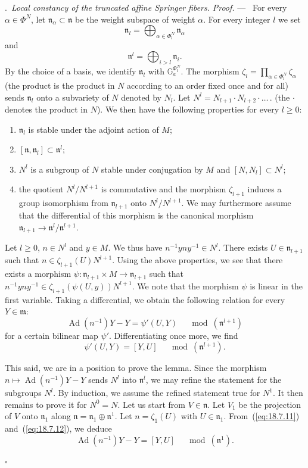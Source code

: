 \documentclass[12pt,a4paper,oneside,english,leqno]{smfart}
\makeatletter
\numberwithin{equation}{subsection}
\numberwithin{theo}{subsection}
\newenvironment{paragr}[1][]{\medskip\refstepcounter{subsection}%
  \par\noindent\hspace*{\parindent}\thesubsection.\ \emph{#1}%
  \@ifundefined{@empty}{}{}\ignorespaces}{\medskip}
\theoremstyle{plain}
\theoremstyle{definition}
\theoremstyle{remark}
\newenvironment{preuve}[1][]{\medskip\noindent\textit{Proof.} #1 ---\ }%
  {\hfill\ensuremath{\square}\medskip}
\DeclareMathOperator{\Ad}{Ad}
\newcommand{\mgo}{\mathfrak{m}}
\newcommand{\ngo}{\mathfrak{n}}
\newcommand{\al}{\alpha}
\renewcommand{\geq}{\geqslant}
\makeatother
\begin{document}
\begin{paragr}[Local constancy of the truncated affine Springer fibers.]
\begin{preuve}
For every $\al\in\Phi^N$, let $\ngo_\al\subset\ngo$ be the weight subspace of weight $\al$. For every integer $l$ we set
$$
\ngo_l=\bigoplus_{\al\in\Phi_l^N}\ngo_\al
$$
and
$$
\ngo^l=\bigoplus_{i>l}\ngo_i.
$$
By the choice of a basis, we identify $\ngo_l$ with $\mathbb{G}_a^{\Phi_l^N}$. The morphism $\zeta_l=\prod_{\al\in\Phi_l^N}\zeta_\al$ (the product is the product in $N$ according to an order fixed once and for all) sends $\ngo_l$ onto a subvariety of $N$ denoted by $N_l$. Let $N^l=N_{l+1}\cdot N_{l+2}\cdot\ldots$\,. (the $\cdot$ denotes the product in $N$). We then have the following properties for every $l\geq 0$:
\begin{enumerate}
\item $\ngo_l$ is stable under the adjoint action of $M$; \item $[\ngo,\ngo_l]\subset\ngo^l$; \item $N^l$ is a subgroup of $N$ stable under conjugation by $M$ and $[N,N_l]\subset N^l$; \item the quotient $N^l/N^{l+1}$ is commutative and the morphism $\zeta_{l+1}$ induces a group isomorphism from $\ngo_{l+1}$ onto $N^l/N^{l+1}$. We may furthermore assume that the differential of this morphism is the canonical morphism $\ngo_{l+1}\to\ngo^l/\ngo^{l+1}$.
\end{enumerate}
Let $l\geq 0$, $n\in N^l$ and $y\in M$. We thus have $n^{-1}yny^{-1}\in N^l$. There exists $U\in\ngo_{l+1}$ such that $n\in\zeta_{l+1}(U)N^{l+1}$. Using the above properties, we see that there exists a morphism $\psi:\ngo_{l+1}\times M\to\ngo_{l+1}$ such that $n^{-1}yny^{-1}\in\zeta_{l+1}(\psi(U,y))N^{l+1}$. We note that the morphism $\psi$ is linear in the first variable. Taking a differential, we obtain the following relation for every $Y\in\mgo$:
\begin{equation}\label{eq:18.7.11}
\Ad(n^{-1})Y-Y=\psi'(U,Y)\quad\mod(\ngo^{l+1})
\end{equation}
for a certain bilinear map $\psi'$. Differentiating once more, we find
\begin{equation}\label{eq:18.7.12}
\psi'(U,Y)=[Y,U]\quad\mod(\ngo^{l+1}).
\end{equation}

This said, we are in a position to prove the lemma. Since the morphism $n\mapsto\Ad(n^{-1})Y-Y$ sends $N^l$ into $\ngo^l$, we may refine the statement for the subgroups $N^l$. By induction, we assume the refined statement true for $N^1$. It then remains to prove it for $N^0=N$. Let us start from $V\in\ngo$. Let $V_1$ be the projection of $V$ onto $\ngo_1$ along $\ngo=\ngo_1\oplus\ngo^1$. Let $n=\zeta_1(U)$ with $U\in\ngo_1$. From~(\ref{eq:18.7.11}) and~(\ref{eq:18.7.12}), we deduce
$$
\Ad(n^{-1})Y-Y=[Y,U]\quad\mod(\ngo^1).
$$


\end{preuve}
\end{paragr}
\end{document}

